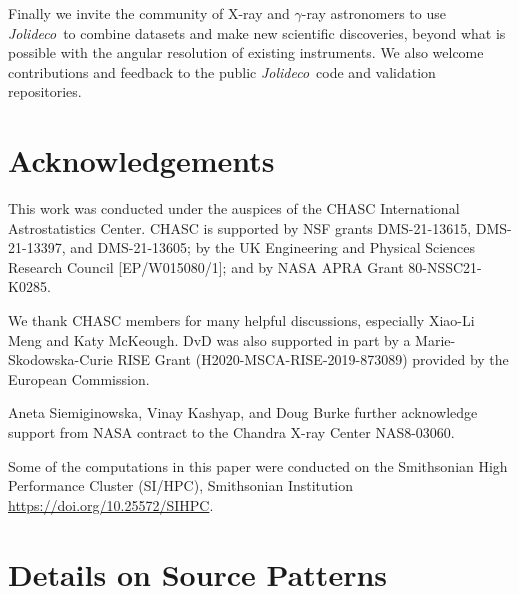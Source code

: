 \documentclass[twocolumn]{aastex631}
\newcommand{\jolideco}{\textit{Jolideco}~}
\newcommand{\gammaray}{$\gamma$-ray\xspace}
\newcommand{\todo}[1]{\textcolor{red}{TODO: #1}\PackageWarning{TODO:}{#1!}}
\begin{document}
    Finally we invite the community of X-ray and \gammaray astronomers to use  \jolideco to combine datasets and make new scientific discoveries, beyond what is possible with the angular resolution of existing instruments. We also welcome contributions and feedback to the public \jolideco code and validation repositories. 

    \section*{Acknowledgements}
    This work was conducted under the auspices of the CHASC International Astrostatistics Center.
    CHASC is supported by NSF grants DMS-21-13615, DMS-21-13397, and DMS-21-13605; by the UK Engineering
    and Physical Sciences Research Council [EP/W015080/1]; and by NASA APRA Grant 80-NSSC21-K0285.
    
    We thank CHASC members for many helpful discussions, especially Xiao-Li Meng and Katy McKeough.
    DvD was also supported in part by a Marie-Skodowska-Curie RISE Grant (H2020-MSCA-RISE-2019-873089)
    provided by the European Commission.
    
    Aneta Siemiginowska, Vinay Kashyap, and Doug Burke further acknowledge support from NASA
    contract to the Chandra X-ray Center NAS8-03060.

    Some of the computations in this paper were conducted on the Smithsonian High Performance
    Cluster (SI/HPC), Smithsonian Institution \url{https://doi.org/10.25572/SIHPC}.

    \newpage
    

    \appendix
    \section{Details on Source Patterns}

    
\end{document}
